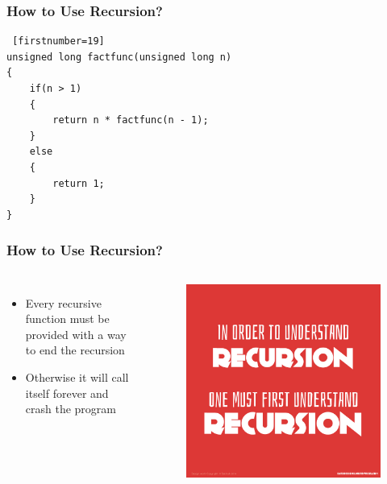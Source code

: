\documentclass{beamer}
\begin{document}
\begin{frame}[fragile]\frametitle{How to Use Recursion?}
    \lstset{style=mystyle}
\begin{lstlisting} [firstnumber=19]
unsigned long factfunc(unsigned long n)
{
    if(n > 1)
    {
        return n * factfunc(n - 1);
    }
    else
    {
        return 1;
    }
}
\end{lstlisting}
\end{frame}

\begin{frame}\frametitle{How to Use Recursion?}
    \begin{columns}
        \begin{itemize}
            \item Every recursive function must be provided with a way to end the recursion
            \item Otherwise it will call itself forever and crash the program
        \end{itemize}
        \begin{figure}
            \centering
            \includegraphics[scale=0.18]{recurse.jpg}
        \end{figure}
    \end{columns}
\end{frame}
\end{document}
